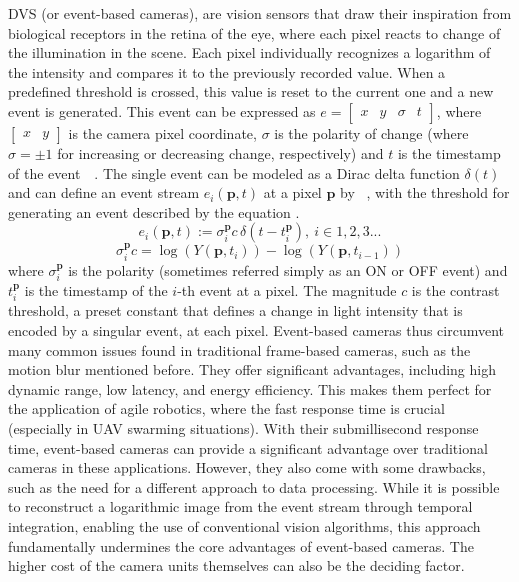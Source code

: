 \ac{DVS} (or event-based cameras), are vision sensors that draw their inspiration from biological receptors in the retina of the eye, where each pixel reacts
to change of the illumination in the scene. Each pixel individually recognizes a logarithm of the intensity and compares it to the previously
recorded value. When a predefined threshold is crossed, this value is reset to the current one and a new event is generated. This event can be expressed as $e = \begin{bmatrix} x & y & \sigma & t \end{bmatrix}$, where $\begin{bmatrix} x & y \end{bmatrix}$
is the camera pixel coordinate, $\sigma$ is the polarity of change (where $\sigma = \pm 1$ for increasing or decreasing change, respectively) and $t$ is the timestamp of the event~\cite{gallego22event}~\cite{scheerlinck2018event}. The single event can be modeled as a Dirac delta function $\delta(t)$ and can define an event stream
$e_i(\boldsymbol{p}, t)$ at a pixel $\boldsymbol{p}$ by ~\cite{scheerlinck2018event},
with the threshold for generating an event described by the equation .
\begin{equation}
e_i(\boldsymbol{p}, t) := \sigma_i^{\boldsymbol{p}} c \, \delta(t - t_i^{\boldsymbol{p}}), \ i \in 1, 2, 3 ...
\label{eq:event_eq}
\end{equation}
\begin{equation}
\sigma_i^{\boldsymbol{p}} c = \log(Y(\boldsymbol{p}, t_i)) - \log(Y(\boldsymbol{p}, t_{i-1}))
\label{eq:bias_eq}
\end{equation}
where $\sigma_i^{\boldsymbol{p}}$ is the polarity (sometimes referred simply as an ON or OFF event) and $t_i^{\boldsymbol{p}}$ is the timestamp of the $i$-th event at a pixel.
The magnitude $c$ is the contrast threshold, a preset constant that defines a change in light intensity that is encoded by a singular event, at each pixel. Event-based cameras thus circumvent many common issues found in traditional frame-based cameras, such as the motion blur mentioned before. They offer significant advantages, including high dynamic range, low latency,
and energy efficiency.
This makes them perfect for the application of agile robotics,
where the fast response time is crucial (especially in UAV swarming situations). With their submillisecond response time,
event-based cameras can provide a significant advantage over traditional cameras in these applications.
However, they also come with some drawbacks, such as the need for a different approach to
data processing. While it is possible to reconstruct a logarithmic image from the event stream through temporal integration,
enabling the use of conventional vision algorithms, this approach fundamentally undermines the core advantages of event-based cameras.
The higher cost of the camera units themselves can also be the deciding factor.~\cite{gallego22event}

